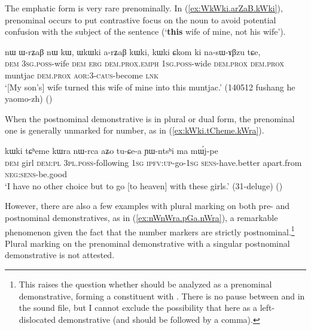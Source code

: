 The emphatic form is very rare prenominally. In (\ref{ex:WkWki.arZaB.kWki}), prenominal  occurs to put contrastive focus on the noun to avoid potential confusion with the subject of the sentence (`\textbf{this} wife of mine, not his wife').

\begin{exe}
\ex \label{ex:WkWki.arZaB.kWki}
 \gll   nɯ ɯ-rʑaβ nɯ kɯ, ɯkɯki a-rʑaβ kɯki, kɯki ɕkom ki na-sɯ-ɤβzu tɕe, \\
 \textsc{dem} \textsc{3sg}.\textsc{poss}-wife \textsc{dem} \textsc{erg} \textsc{dem}.\textsc{prox}.\textsc{emph} \textsc{1sg}.\textsc{poss}-wide \textsc{dem}.\textsc{prox} \textsc{dem}.\textsc{prox} muntjac \textsc{dem}.\textsc{prox}  \textsc{aor}:3\flobv{}-\textsc{caus}-become \textsc{lnk} \\
\glt `[My son's] wife turned this wife of mine into this muntjac.' (140512 fushang he yaomo-zh)
()
\end{exe}

When the postnominal demonstrative is in plural or dual form, the prenominal one is generally unmarked for number, as in (\ref{ex:kWki.tCheme.kWra}).

\begin{exe}
\ex \label{ex:kWki.tCheme.kWra}
 \gll kɯki tɕʰeme kɯra nɯ-rca aʑo tu-ɕe-a ɲɯ-ntsʰi ma mɯ́j-pe \\
 \textsc{dem} girl \textsc{dem}:\textsc{pl} \textsc{3pl}.\textsc{poss}-following \textsc{1sg} \textsc{ipfv}:\textsc{up}-go-\textsc{1sg} \textsc{sens}-have.better apart.from \textsc{neg}:\textsc{sens}-be.good \\
 \glt `I have no other choice but to go [to heaven] with these girls.' (31-deluge)
()
 \end{exe}

However, there are also a few examples with plural marking on both pre- and postnominal demonstratives, as in (\ref{ex:nWnWra.pGa.nWra}), a remarkable phenomenon given the fact that the number markers are strictly postnominal.\footnote{This raises the question whether  should be analyzed as a prenominal demonstrative, forming a constituent with . There is no pause between  and  in the sound file, but I cannot exclude the possibility that  here as a left-dislocated demonstrative (and should be followed by a comma).  } Plural marking on the prenominal demonstrative with a singular postnominal demonstrative is not attested.
 
